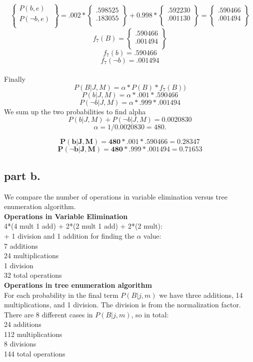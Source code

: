 \[
\begin{Bmatrix} P(b,e) \\ P(\neg b, e) \\ \end{Bmatrix} =
.002 * \begin{Bmatrix} .598525 \\ .183055 \\\end{Bmatrix} + 0.998 * \begin{Bmatrix}.592230 \\ .001130 \\ \end{Bmatrix} =
\begin{Bmatrix} .590466 \\ .001494 \\ \end{Bmatrix}
\]
\[
f_7(B) = \begin{Bmatrix} .590466 \\ .001494 \\ \end{Bmatrix}
\]
\[
f_7(b) = .590466
\]
\[
f_7(\neg b) = .001494
\]
\\
Finally
\[
P(B|J,M) = \alpha * P(B) * f_7(B) )
\]
\[
P(b|J,M) = \alpha * .001 * .590466
\]
\[
P(\neg b|J,M) = \alpha * .999 * .001494
\]
We sum up the two probabilities to find alpha
\[
{P(b|J,M) + P(\neg b | J,M) = 0.0020830}
\]
\[
\alpha = 1 / 0.0020830 = 480.
\]

\[
\bm{
P(b|J,M) = 480 * .001 * .590466 = 0.28347
}
\]
\[
\bm{
P(\neg b|J,M) = 480 * .999 * .001494 = 0.71653
}
\]


\subsection{part b.}
We compare the number of operations in variable elimination versus tree enumeration algorithm. \\

\textbf{Operations in Variable Elimination} \\
4*(4 mult 1 add) +  2*(2 mult 1 add) + 2*(2 mult): \\
+ 1 division and 1 addition for finding the $\alpha$ value: \\
7 additions \\
24 multiplications \\
1 division \\
32 total operations \\

\textbf{Operations in tree enumeration algorithm} \\
For each probability in the final term $P(B|j,m)$ we have three additions, 14 multiplications, and 1 division. The division is from the normalization factor.
There are 8 different cases in $P(B|j,m)$, so in total: \\
24 additions \\
112 multiplications \\
8 divisions \\
144 total operations \\


